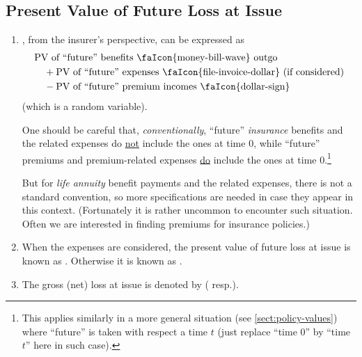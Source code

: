 \subsection{Present Value of Future Loss at Issue}
\begin{enumerate}
\item \label{it:pv-future-loss-at-issue}
, from the insurer's 
perspective, can be expressed as
\begin{align*}
&\text{PV of ``future'' benefits \faIcon{money-bill-wave} outgo} \\
&\quad+ \text{PV of ``future'' expenses \faIcon{file-invoice-dollar} (if considered)}\\
&\quad- \text{PV of ``future'' premium incomes \faIcon{dollar-sign}}
\end{align*}
(which is a random variable).

\begin{warning}
One should be careful that, \emph{conventionally}, ``future'' \emph{insurance}
benefits and the related expenses do \underline{not} include the ones at time
0, while ``future'' premiums and premium-related expenses \underline{do}
include the ones at time 0.\footnote{This applies similarly in a more general
situation (see \cref{sect:policy-values}) where ``future'' is taken with
respect a time \(t\) (just replace ``time 0'' by ``time \(t\)'' here in such
case).}

But for \emph{life annuity} benefit payments and the related expenses,
there is not a standard convention, so more specifications are needed in case
they appear in this context.  (Fortunately it is rather uncommon to encounter
such situation. Often we are interested in finding premiums for insurance
policies.)
\end{warning}

\item When the expenses  are considered, the
present value of future loss at issue is known as .
Otherwise it is known as .

\item The gross (net) loss at issue is denoted by 
( resp.).



\end{enumerate}
